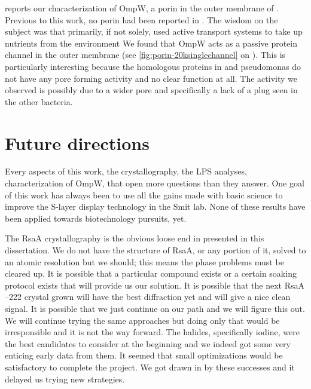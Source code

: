  reports our characterization of OmpW, a porin in the outer membrane of \caulobacter{}. Previous to this work, no porin had been reported in \caulobacter{}. The wisdom on the subject was that \caulobacter{} primarily, if not solely, used active transport systems to take up nutrients from the environment We found that OmpW acts as a passive protein channel in the outer membrane (see \cref{fig:porin-20ksinglechannel} on ). This is particularly interesting because the homologous proteins in \ecoli{} and \ac{pseudomonas} do not have any pore forming activity and no clear function at all.  The activity we observed is possibly due to a wider pore and specifically a lack of a plug seen in the other bacteria.  

\section{Future directions}\label{sec:future-directions}

Every aspects of this work, the crystallography, the \ac{LPS} analyses, characterization of OmpW, that open more questions than they answer. One goal of this work has always been to use all the gains made with basic science to improve the \caulobacter{} \ac{S-layer} display technology in the Smit lab. None of these results have been applied towards biotechnology pursuits, yet.

The RsaA crystallography is the obvious loose end in presented in this dissertation. We do not have the structure of RsaA, or any portion of it, solved to an atomic resolution but we should; this means the phase problems must be cleared up. It is possible that a particular compound exists or a certain soaking protocol exists that will provide us our solution. It is possible that the next RsaA --222 crystal grown will have the best diffraction yet and will give a nice clean signal. It is possible that we just continue on our path and we will figure this out. We will continue trying the same approaches but doing only that would be irresponsible and it is not the way forward. The halides, specifically iodine, were the best candidates to consider at the beginning and we indeed got some very enticing early data from them. It seemed that small optimizations would be satisfactory to complete the project. We got drawn in by these successes and it delayed us trying new strategies.

